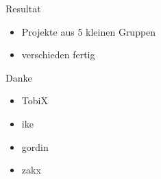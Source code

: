 \documentclass[ngerman,compress]{beamer}
\begin{document}
\begin{frame}{Resultat}
	\begin{itemize}
		\item Projekte aus 5 kleinen Gruppen
		\item verschieden fertig
	\end{itemize}
	\begin{center}
	\end{center}
\end{frame}

\begin{frame}{Danke}
	\begin{center}
	\end{center}
	\begin{itemize}
		\item TobiX
		\item ike
		\item gordin
		\item zakx
	\end{itemize}
\end{frame}
\end{document}
